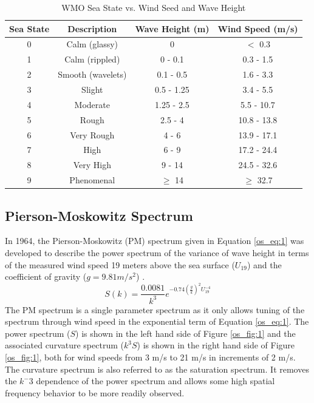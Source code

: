 \begin{table}[H]
  \begin{center}
      \renewcommand{\baselinestretch}{1} \small\normalsize
  \begin{quote}
    \caption[WMO Sea State vs. Wind Speed and Wave Height]{WMO Sea State vs. Wind Seed and Wave Height\label{os_tab:0}}
  \end{quote}
  \begin{tabular} {|c | c | c| c|}
    \hline
  \bf{Sea State} & \bf{Descriptio}n & \bf{Wave Height (m)} & \bf{Wind Speed (m/s)}\\ \hline
  0 & Calm (glassy) & 0 & $<$ 0.3 \\ \hline
  1 & Calm (rippled) & 0 - 0.1 & 0.3 - 1.5 \\ \hline
  2 & Smooth (wavelets) & 0.1 - 0.5 & 1.6 - 3.3 \\ \hline
  3 & Slight & 0.5 - 1.25 & 3.4 - 5.5 \\ \hline
  4 & Moderate & 1.25 - 2.5 & 5.5 - 10.7 \\ \hline
  5 & Rough & 2.5 - 4 & 10.8 - 13.8 \\ \hline
  6 & Very Rough & 4 - 6 & 13.9 - 17.1\\ \hline
  7 & High & 6 - 9 & 17.2 - 24.4\\ \hline
  8 & Very High & 9 - 14 & 24.5 - 32.6\\ \hline
  9 & Phenomenal & $\geq$ 14 & $\geq$ 32.7\\ \hline
\end{tabular}
\end{center}
\end{table}
\renewcommand{\baselinestretch}{2} \small\normalsize

\subsection{Pierson-Moskowitz Spectrum}
In 1964, the Pierson-Moskowitz (PM) spectrum given in Equation \ref{os_eq:1} was developed to describe the power spectrum of the variance of wave height in terms of the measured wind speed 19 meters above the sea surface ($U_{19}$) and the coefficient of gravity ($g=9.81 m/s^2$) \cite{michel_sea_spectra}. 
 \begin{equation}
S(k) = \frac{0.0081}{k^3}e^{-0.74\left(\frac{g}{k}\right)^2U_{19}^{-4}}
\label{os_eq:1}
\end{equation}
 \renewcommand{\baselinestretch}{2} \small\normalsize
The PM spectrum is a single parameter spectrum as it only allows tuning of the spectrum through wind speed in the exponential term of Equation \ref{os_eq:1}. The power spectrum ($S$) is shown in the left hand side of Figure \ref{os_fig:1} and the associated curvature spectrum ($k^3S$) is shown in the right hand side of Figure \ref{os_fig:1}, both for wind speeds from 3 m/s to 21 m/s in increments of 2 m/s. The curvature spectrum is also referred to as the saturation spectrum. It removes the $k^-3$ dependence of the power spectrum and allows some high spatial frequency behavior to be more readily observed.
 
